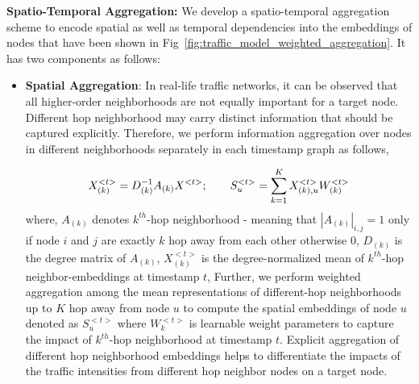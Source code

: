 \documentclass[runningheads]{llncs}
\begin{document}
\noindent
\textbf{Spatio-Temporal Aggregation:}
We develop a spatio-temporal aggregation scheme to encode spatial as well as temporal dependencies into the embeddings of nodes that have been shown in Fig~\ref{fig:traffic_model_weighted_aggregation}. It has two components as follows: 
\begin{itemize}
   
    \item \textbf{Spatial Aggregation}: In real-life traffic networks, it can be observed that all higher-order neighborhoods are not equally important for a target node. Different hop neighborhood may carry distinct information that should be captured explicitly. Therefore, we perform information aggregation over nodes in different neighborhoods separately in each timestamp graph as follows,
 
    \begin{equation}
    X_{(k)}^{<t>} = D_{(k)}^{-1} A_{(k)}X^{<t>}; \hspace*{2em} S_{u}^{<t>} = \sum_{k=1}^K  X_{(k),u}^{<t>} W_{(k)}^{<t>}
    \label{eq:spatial_aggregation}
    \end{equation}
    where, $A_{(k)}$ denotes $k^{th}$-hop neighborhood - meaning that $|A_{(k)}|_{i,j} = 1$ only if node $i$ and $j$ are exactly $k$ hop away from each other otherwise 0, $D_{(k)}$ is the degree matrix of $A_{(k)}$, $X_{(k)}^{<t>}$ is the degree-normalized mean of $k^{th}$-hop neighbor-embeddings at timestamp $t$, Further, we perform weighted aggregation among the mean representations of different-hop  neighborhoods up to $K$ hop away from node $u$ to compute the spatial embeddings of node $u$ denoted as $S_{u}^{<t>}$ where $W_k^{<t>}$ is learnable weight parameters to capture the impact of $k^{th}$-hop neighborhood at timestamp $t$. Explicit aggregation of different hop neighborhood embeddings helps to differentiate the impacts of the traffic intensities from different hop neighbor nodes on a target node.
    

    
\begin{figure*}[b]
\centering
{}
\caption{Spatio-Temporal Aggregation Scheme: To capture complex spatio-temporal dependencies in traffic networks, the historical model concatenates the spatial embeddings from different hop neighborhoods at timestamp $t$ with temporal embedding $\tilde{Z}_{H}^{t}$ - the weighted aggregation of (${Z}_{H}^{1},\dots,{Z}_{H}^{t-1}$), to learn spatio-temporal embeddings ${Z}_{H}^{t}$. Similarly, current-day model performs the same process.}
\label{fig:traffic_model_weighted_aggregation}
\end{figure*}    
    

\end{itemize}
\end{document}
